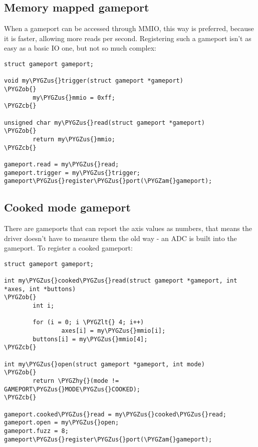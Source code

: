 \documentclass[a4paper,8pt,english]{sphinxmanual}
\def\PYGZus{\char`\_}
\def\PYGZob{\char`\{}
\def\PYGZcb{\char`\}}
\def\PYGZam{\char`\&}
\def\PYGZlt{\char`\<}
\def\PYGZhy{\char`\-}
\begin{document}
\subsection{Memory mapped gameport}
\label{input/gameport-programming:memory-mapped-gameport}
When a gameport can be accessed through MMIO, this way is preferred, because
it is faster, allowing more reads per second. Registering such a gameport
isn't as easy as a basic IO one, but not so much complex:

\begin{Verbatim}[commandchars=\\\{\}]
struct gameport gameport;

void my\PYGZus{}trigger(struct gameport *gameport)
\PYGZob{}
        my\PYGZus{}mmio = 0xff;
\PYGZcb{}

unsigned char my\PYGZus{}read(struct gameport *gameport)
\PYGZob{}
        return my\PYGZus{}mmio;
\PYGZcb{}

gameport.read = my\PYGZus{}read;
gameport.trigger = my\PYGZus{}trigger;
gameport\PYGZus{}register\PYGZus{}port(\PYGZam{}gameport);
\end{Verbatim}


\subsection{Cooked mode gameport}
\label{input/gameport-programming:cooked-mode-gameport}\label{input/gameport-programming:gameport-pgm-cooked-mode}
There are gameports that can report the axis values as numbers, that means
the driver doesn't have to measure them the old way - an ADC is built into
the gameport. To register a cooked gameport:

\begin{Verbatim}[commandchars=\\\{\}]
struct gameport gameport;

int my\PYGZus{}cooked\PYGZus{}read(struct gameport *gameport, int *axes, int *buttons)
\PYGZob{}
        int i;

        for (i = 0; i \PYGZlt{} 4; i++)
                axes[i] = my\PYGZus{}mmio[i];
        buttons[i] = my\PYGZus{}mmio[4];
\PYGZcb{}

int my\PYGZus{}open(struct gameport *gameport, int mode)
\PYGZob{}
        return \PYGZhy{}(mode != GAMEPORT\PYGZus{}MODE\PYGZus{}COOKED);
\PYGZcb{}

gameport.cooked\PYGZus{}read = my\PYGZus{}cooked\PYGZus{}read;
gameport.open = my\PYGZus{}open;
gameport.fuzz = 8;
gameport\PYGZus{}register\PYGZus{}port(\PYGZam{}gameport);
\end{Verbatim}
\end{document}
